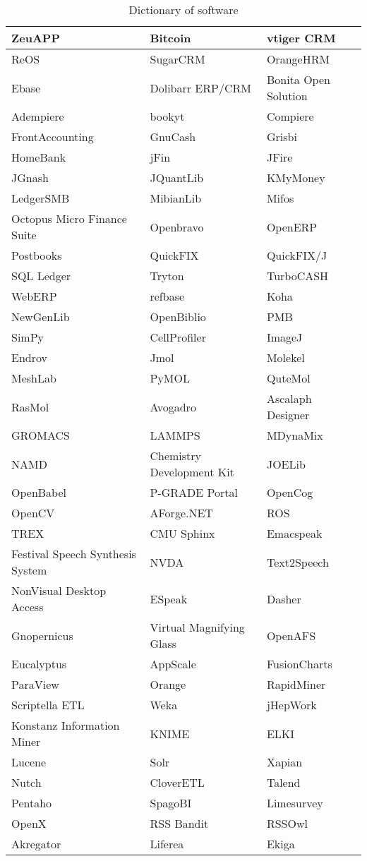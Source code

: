 \begin{table}
\begin{center}
\begin{tabular}{|l|l|l|}\hline
ZeuAPP&Bitcoin&vtiger CRM\\\hline
ReOS&SugarCRM&OrangeHRM\\\hline
Ebase&Dolibarr ERP/CRM&Bonita Open Solution\\\hline
Adempiere&bookyt&Compiere\\\hline
FrontAccounting&GnuCash&Grisbi\\\hline
HomeBank&jFin&JFire\\\hline
JGnash&JQuantLib&KMyMoney\\\hline
LedgerSMB&MibianLib&Mifos\\\hline
Octopus Micro Finance Suite&Openbravo&OpenERP\\\hline
Postbooks&QuickFIX&QuickFIX/J\\\hline
SQL Ledger&Tryton&TurboCASH\\\hline
WebERP&refbase&Koha\\\hline
NewGenLib&OpenBiblio&PMB\\\hline
SimPy&CellProfiler&ImageJ\\\hline
Endrov&Jmol&Molekel\\\hline
MeshLab&PyMOL&QuteMol\\\hline
RasMol&Avogadro&Ascalaph Designer\\\hline
GROMACS&LAMMPS&MDynaMix\\\hline
NAMD&Chemistry Development Kit&JOELib\\\hline
OpenBabel&P-GRADE Portal&OpenCog\\\hline
OpenCV&AForge.NET&ROS\\\hline
TREX&CMU Sphinx&Emacspeak\\\hline
Festival Speech Synthesis System&NVDA&Text2Speech\\\hline
NonVisual Desktop Access&ESpeak&Dasher\\\hline
Gnopernicus&Virtual Magnifying Glass&OpenAFS\\\hline
Eucalyptus&AppScale&FusionCharts\\\hline
ParaView&Orange&RapidMiner\\\hline
Scriptella ETL&Weka&jHepWork\\\hline
Konstanz Information Miner&KNIME&ELKI\\\hline
Lucene&Solr&Xapian\\\hline
Nutch&CloverETL&Talend\\\hline
Pentaho&SpagoBI&Limesurvey\\\hline
OpenX&RSS Bandit&RSSOwl\\\hline
Akregator&Liferea&Ekiga\\\hline
\end{tabular}
\end{center}
\caption{Dictionary of software}
\end{table}

